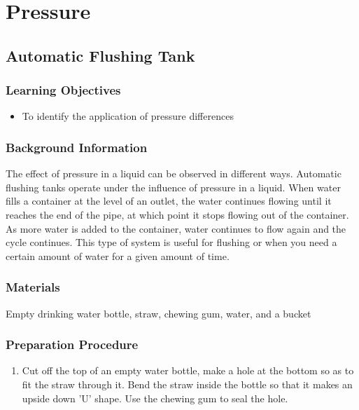 \section{Pressure}

\subsection{Automatic Flushing Tank}

\subsubsection*{Learning Objectives}
\begin{itemize}
\item{To identify the application of pressure differences}
\end{itemize}

\subsubsection*{Background Information}
The effect of pressure in a liquid can be observed in different ways.  Automatic flushing tanks operate under the influence of pressure in a liquid.  When water fills a container at the level of an outlet, the water continues flowing until it reaches the end of the pipe, at which point it stops flowing out of the container.  As more water is added to the container, water continues to flow again and the cycle continues.  This type of system is useful for flushing or when you need a certain amount of water for a given amount of time.

\subsubsection*{Materials}
Empty drinking water bottle, straw, chewing gum, water, and a  bucket  

\subsubsection*{Preparation Procedure}
\begin{enumerate}
\item{Cut off the top of an empty water bottle, make a hole at the bottom so as to fit the straw through it.  
Bend the straw inside the bottle so that it makes an upside down 'U' shape. Use the chewing gum to seal the hole.} 
\end{enumerate}

